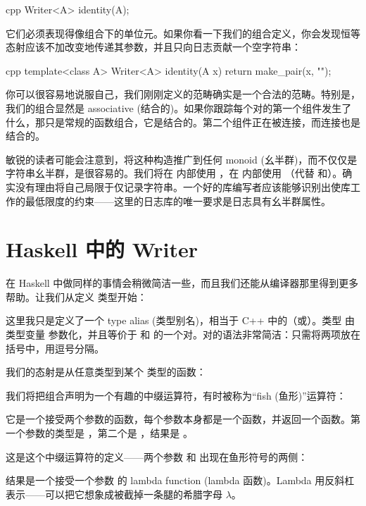 \begin{snip}{cpp}
Writer<A> identity(A);
\end{snip}
它们必须表现得像组合下的单位元。如果你看一下我们的组合定义，你会发现恒等态射应该不加改变地传递其参数，并且只向日志贡献一个空字符串：

\begin{snip}{cpp}
template<class A> Writer<A> identity(A x) {
    return make_pair(x, "");
}
\end{snip}
你可以很容易地说服自己，我们刚刚定义的范畴确实是一个合法的范畴。特别是，我们的组合显然是 associative (结合的)。如果你跟踪每个对的第一个组件发生了什么，那只是常规的函数组合，它是结合的。第二个组件正在被连接，而连接也是结合的。

敏锐的读者可能会注意到，将这种构造推广到任何 monoid (幺半群)，而不仅仅是字符串幺半群，是很容易的。我们将在\mbox{} 内部使用 ，在 内部使用 （代替\code{+} 和）。确实没有理由将自己局限于仅记录字符串。一个好的库编写者应该能够识别出使库工作的最低限度的约束——这里的日志库的唯一要求是日志具有幺半群属性。

\section{Haskell 中的 Writer}

在 Haskell 中做同样的事情会稍微简洁一些，而且我们还能从编译器那里得到更多帮助。让我们从定义\mbox{} 类型开始：

这里我只是定义了一个 type alias (类型别名)，相当于 C++ 中的（或）。类型\mbox{} 由类型变量 参数化，并且等价于\mbox{} 和 的一个对。对的语法非常简洁：只需将两项放在括号中，用逗号分隔。

我们的态射是从任意类型到某个  类型的函数：

我们将把组合声明为一个有趣的中缀运算符，有时被称为“fish (鱼形)”运算符：

它是一个接受两个参数的函数，每个参数本身都是一个函数，并返回一个函数。第一个参数的类型是 ，第二个是 ，结果是 。

这是这个中缀运算符的定义——两个参数  和  出现在鱼形符号的两侧：

结果是一个接受一个参数  的 lambda function (lambda 函数)。Lambda 用反斜杠表示——可以把它想象成被截掉一条腿的希腊字母 $\lambda$。

